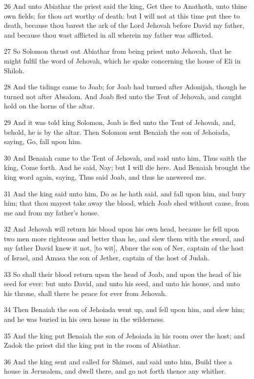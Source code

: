 \par 26 And unto Abiathar the priest said the king, Get thee to Anathoth, unto thine own fields; for thou art worthy of death: but I will not at this time put thee to death, because thou barest the ark of the Lord Jehovah before David my father, and because thou wast afflicted in all wherein my father was afflicted.
\par 27 So Solomon thrust out Abiathar from being priest unto Jehovah, that he might fulfil the word of Jehovah, which he spake concerning the house of Eli in Shiloh.
\par 28 And the tidings came to Joab; for Joab had turned after Adonijah, though he turned not after Absalom. And Joab fled unto the Tent of Jehovah, and caught hold on the horns of the altar.
\par 29 And it was told king Solomon, Joab is fled unto the Tent of Jehovah, and, behold, he is by the altar. Then Solomon sent Benaiah the son of Jehoiada, saying, Go, fall upon him.
\par 30 And Benaiah came to the Tent of Jehovah, and said unto him, Thus saith the king, Come forth. And he said, Nay; but I will die here. And Benaiah brought the king word again, saying, Thus said Joab, and thus he answered me.
\par 31 And the king said unto him, Do as he hath said, and fall upon him, and bury him; that thou mayest take away the blood, which Joab shed without cause, from me and from my father's house.
\par 32 And Jehovah will return his blood upon his own head, because he fell upon two men more righteous and better than he, and slew them with the sword, and my father David knew it not, [to wit], Abner the son of Ner, captain of the host of Israel, and Amasa the son of Jether, captain of the host of Judah.
\par 33 So shall their blood return upon the head of Joab, and upon the head of his seed for ever: but unto David, and unto his seed, and unto his house, and unto his throne, shall there be peace for ever from Jehovah.
\par 34 Then Benaiah the son of Jehoiada went up, and fell upon him, and slew him; and he was buried in his own house in the wilderness.
\par 35 And the king put Benaiah the son of Jehoiada in his room over the host; and Zadok the priest did the king put in the room of Abiathar.
\par 36 And the king sent and called for Shimei, and said unto him, Build thee a house in Jerusalem, and dwell there, and go not forth thence any whither.

